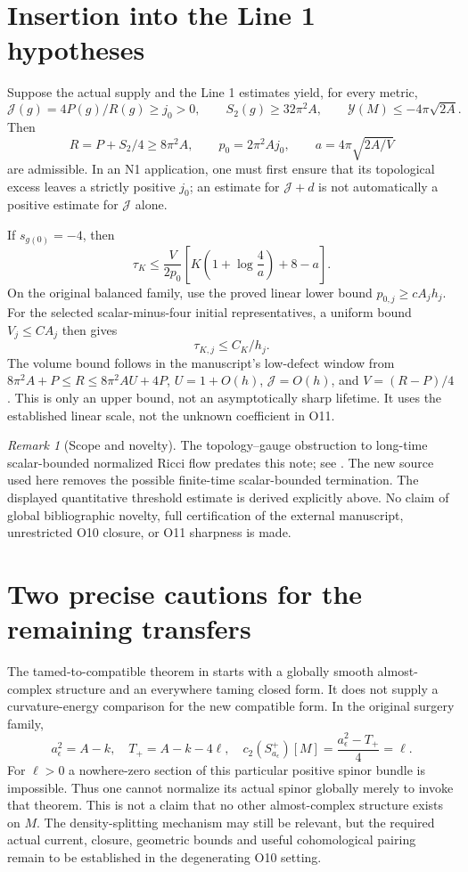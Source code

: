 \documentclass[11pt]{article}
\theoremstyle{remark}\newtheorem{remark}[theorem]{Remark}
\newcommand{\Yam}{\mathcal Y}
\begin{document}
\section{Insertion into the Line 1 hypotheses}
Suppose the actual supply and the Line 1 estimates yield, for every
metric,
\[
 \mathcal J(g)=4P(g)/R(g)\ge j_0>0,
 \qquad S_2(g)\ge32\pi^2 A,
 \qquad\Yam(M)\le-4\pi\sqrt{2A}.
\]
Then
\[
 R=P+S_2/4\ge8\pi^2A,\qquad
 p_0=2\pi^2Aj_0,\qquad a=4\pi\sqrt{2A/V}
\]
are admissible. In an N1 application, one must first ensure that
its topological excess leaves a strictly positive $j_0$; an estimate
for $\mathcal J+d$ is not automatically a positive estimate for
$\mathcal J$ alone.

If $s_{g(0)}=-4$, then
\begin{equation}
 \tau_K\le\frac{V}{2p_0}
 \left[K\left(1+\log\frac4a\right)+8-a\right].
 \label{eq:constant-initial}
\end{equation}
On the original balanced family, use the proved linear lower bound
$p_{0,j}\ge cA_jh_j$. For the selected scalar-minus-four initial
representatives, a uniform bound $V_j\le C A_j$ then gives
\[
 \tau_{K,j}\le C_K/h_j.
\]
The volume bound follows in the manuscript's low-defect window from
$8\pi^2A+P\le R\le8\pi^2AU+4P$, $U=1+O(h)$,
$\mathcal J=O(h)$, and $V=(R-P)/4$.
This is only an upper bound, not an asymptotically sharp lifetime.
It uses the established linear scale, not the unknown coefficient in O11.

\begin{remark}[Scope and novelty]
The topology--gauge obstruction to long-time scalar-bounded normalized
Ricci flow predates this note; see \cite{Ishida}. The new source used
here removes the possible finite-time scalar-bounded termination.
The displayed quantitative threshold estimate is derived explicitly
above. No claim of global bibliographic novelty, full certification of
the external manuscript, unrestricted O10 closure, or O11 sharpness
is made.
\end{remark}

\section{Two precise cautions for the remaining transfers}
The tamed-to-compatible theorem in \cite{OAITame} starts with a globally
smooth almost-complex structure and an everywhere taming closed form.
It does not supply a curvature-energy comparison for the new compatible
form. In the original surgery family,
\[
 a_\epsilon^2=A-k,\quad T_+=A-k-4\ell,\quad
 c_2(S^+_{a_\epsilon})[M]=\frac{a_\epsilon^2-T_+}{4}=\ell.
\]
For $\ell>0$ a nowhere-zero section of this particular positive spinor
bundle is impossible. Thus one cannot normalize its actual spinor
globally merely to invoke that theorem. This is not a claim that no
other almost-complex structure exists on $M$. The density-splitting
mechanism may still be relevant, but the required actual current,
closure, geometric bounds and useful cohomological pairing remain to
be established in the degenerating O10 setting.
\end{document}
